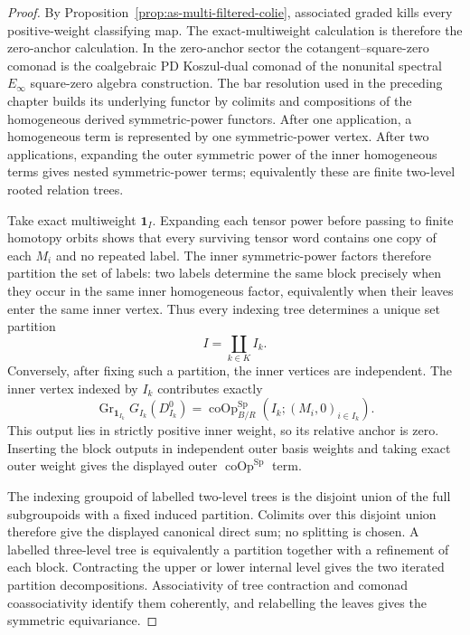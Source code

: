 \begin{proof}
By Proposition~\ref{prop:as-multi-filtered-colie}, associated graded kills
every positive-weight classifying map.  The exact-multiweight calculation is
therefore the zero-anchor calculation.  In the zero-anchor sector the
cotangent--square-zero comonad is the coalgebraic PD Koszul-dual comonad of
the nonunital spectral $E_\infty$ square-zero algebra construction.  The
bar resolution used in the preceding chapter builds its underlying functor by
colimits and compositions of the homogeneous derived symmetric-power
functors.  After one application, a homogeneous term is represented by one
symmetric-power vertex.  After two applications, expanding the outer
symmetric power of the inner homogeneous terms gives nested symmetric-power
terms; equivalently these are finite two-level rooted relation trees.

Take exact multiweight $\mathbf1_I$.  Expanding each tensor power before
passing to finite homotopy orbits shows that every surviving tensor word
contains one copy of each $M_i$ and no repeated label.  The inner
symmetric-power factors therefore partition the set of labels: two labels
determine the same block precisely when they occur in the same inner
homogeneous factor, equivalently when their leaves enter the same inner
vertex.  Thus every indexing tree determines a
unique set partition
\[
    I=\coprod_{k\in K}I_k.
\]
Conversely, after fixing such a partition, the inner vertices are independent.
The inner vertex indexed by $I_k$ contributes exactly
\[
    \operatorname{Gr}_{\mathbf1_{I_k}}G_{I_k}(D_{I_k}^0)
    =
    \operatorname{coOp}^{\mathrm{Sp}}_{B/R}
    (I_k;(M_i,0)_{i\in I_k}).
\]
This output lies in strictly positive inner weight, so its relative anchor is
zero.  Inserting the block outputs in independent outer basis weights and
taking exact outer weight gives the displayed outer
$\operatorname{coOp}^{\mathrm{Sp}}$ term.

The indexing groupoid of labelled two-level trees is the disjoint union of
the full subgroupoids with a fixed induced partition.  Colimits over this
disjoint union therefore give the displayed canonical direct sum; no splitting
is chosen.  A labelled three-level tree is equivalently a partition together
with a refinement of each block.  Contracting the upper or lower internal
level gives the two iterated partition decompositions.  Associativity of tree
contraction and comonad coassociativity identify them coherently, and
relabelling the leaves gives the symmetric equivariance.
\end{proof}

